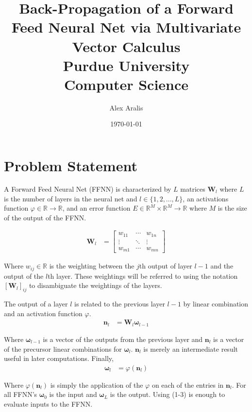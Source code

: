 \documentclass[12pt,letterpaper]{article}
\title{\textbf{Back-Propagation of a Forward Feed Neural Net via Multivariate Vector Calculus } \\ Purdue University \\ \small{Computer Science}}
\author{Alex Aralis}
\date{\today}
\begin{document}
\maketitle

\section{Problem Statement}

A Forward Feed Neural Net (FFNN) is characterized by $L$ matrices $\textbf{W}_l$ where $L$ is the number of layers in the neural net and $l \in \{1, 2,... , L\}$, an activations function $\varphi \in  \mathbb{R} \to  \mathbb{R}$, and an error function $E \in  \mathbb{R}^M \times \mathbb{R}^M \to  \mathbb{R}$ where $M$ is the size of the output of the FFNN.  

\begin{align}
\boldsymbol{W}_l 
&=
\begin{bmatrix}
w_{11} & \cdots & w_{1n}\\ 
\vdots &  \ddots & \vdots\\ 
w_{m1} & \cdots & w_{mn}
\end{bmatrix}
\end{align}

Where $w_{ij} \in \mathbb{R}$ is the weighting between the $j$th output of layer $l-1$ and the output of the $l$th layer.  These weightings will be referred to using the notation $\left[\boldsymbol{W}_l\right]_{ij}$ to disambiguate the weightings of the layers.

The output of a layer $l$ is related to the previous layer $l-1$ by linear combination and an activation function $\varphi$. 
\begin{align}
\boldsymbol{n}_l 
&= 
\boldsymbol{W}_l \boldsymbol{\omega}_{l-1}
\end{align}

Where $\boldsymbol{\omega}_{l-1}$ is a vector of the outputs from the previous layer and $\boldsymbol{n}_l$ is a vector of the precursor linear combinations for $\boldsymbol{\omega}_{l}$. $\boldsymbol{n}_l$ is merely an intermediate result useful in later computations. Finally,
\begin{align}
\boldsymbol{\omega}_{l} 
&= 
\varphi(\boldsymbol{n}_l)
\end{align}

Where $\varphi(\boldsymbol{n}_l)$ is simply the application of the $\varphi$ on each of the entries in $\boldsymbol{n}_l$.  For all FFNN's $\boldsymbol{\omega}_0$ is the input and $\boldsymbol{\omega}_L$ is the output.  Using (1-3) is enough to evaluate inputs to the FFNN.
\end{document}

